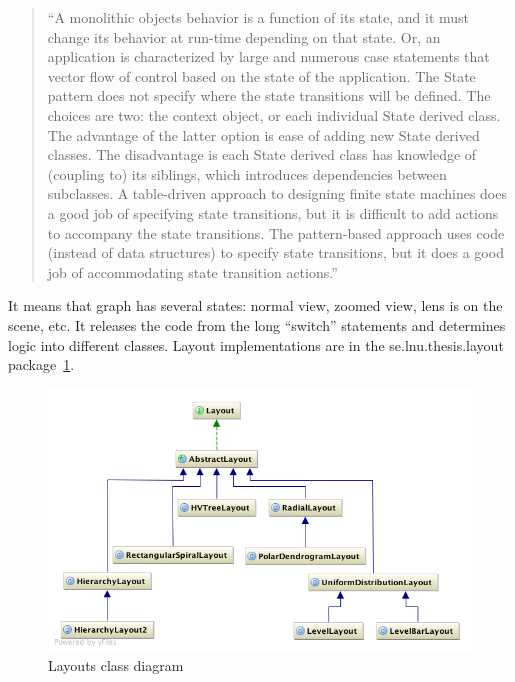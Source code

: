 \begin{quotation}
``A monolithic objects behavior is a function of its state, and it must change its behavior at run-time depending on that state.
Or, an application is characterized by large and numerous case statements that vector flow of control based on the state
of the application. The State pattern does not specify where the state transitions will be defined. The choices are two:
the context object, or each individual State derived class.
The advantage of the latter option is ease of adding new State derived classes.
The disadvantage is each State derived class has knowledge of (coupling to) its siblings,
which introduces dependencies between subclasses.
A table-driven approach to designing finite state machines does a good job of specifying state transitions,
but it is difficult to add actions to accompany the state transitions. The pattern-based approach uses code
(instead of data structures) to specify state transitions,
but it does a good job of accommodating state transition actions.''~\cite{STATE}
\end{quotation}

It means that graph has several states: normal view, zoomed view, lens is on the scene, etc. It releases the code from the long ``switch'' statements  and determines logic into different classes. Layout implementations are in the \textsf{se.lnu.thesis.layout} package~\ref{fig:uml_layouts}.

\begin{figure}[h!]
\centering
\includegraphics[scale=0.5]{pictures/uml_layouts.png}
\caption{Layouts class diagram}
\label{fig:uml_layouts}
\end{figure}
